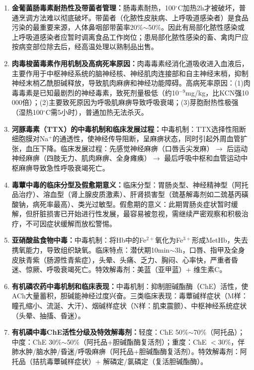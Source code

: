 {\begin{enumerate}[leftmargin=*, itemsep=4pt]
    \item \textbf{金葡菌肠毒素耐热性及带菌者管理：}肠毒素耐热，100$^\circ$C加热2h才被破坏，普通烹调方法难以彻底破坏。带菌者（化脓性皮肤病、上呼吸道感染者）是食品污染的最重要来源，人体鼻咽部带菌率20\%$\sim$50\%。因此有局部化脓性感染或上呼吸道感染者应暂时调离食品工作岗位；患局部化脓性感染的畜、禽肉尸应按病变部位除去后，经高温处理以熟制品出售。

    \item \textbf{肉毒梭菌毒素作用机制及高病死率原因：}肉毒毒素经消化道吸收进入血液后，主要作用于中枢神经系统的脑神经核、神经肌肉连接部和自主神经末梢，抑制神经末梢乙酰胆碱释放，导致肌肉麻痹和神经功能障碍。高病死率原因：(1)肉毒毒素是已知最剧烈的神经毒素，致死剂量极低（约10$^{-9}$mg/kg，比KCN强10\,000倍）；(2)主要致死原因为呼吸肌麻痹导致呼吸衰竭；(3)芽胞耐热性极强（湿热100$^\circ$C需5小时），普通加热无法杀灭。

    \item \textbf{河豚毒素（TTX）的中毒机制和临床发展过程：}中毒机制：TTX选择性阻断细胞膜对Na$^+$的通透性，使神经传导阻断，呈麻痹状态，同时引起外周血管扩张，血压下降。临床发展过程：先感觉神经麻痹（口唇舌尖发麻）$\to$ 后运动神经麻痹（四肢无力、肌肉麻痹、全身瘫痪）$\to$ 最后呼吸中枢和血管运动中枢麻痹导致急性呼吸衰竭死亡。

    \item \textbf{毒蕈中毒的临床分型及假愈期意义：}临床分型：胃肠炎型、神经精神型（阿托品治疗）、溶血型（肾上腺皮质激素）、肝肾损害型（巯基解毒剂如二巯基丙磺酸钠，病死率最高）、类光过敏型。假愈期的意义：此期胃肠炎症状暂时缓解，但肝脏损害已开始进行性发展，最容易被忽视，需继续严密观察和积极治疗，不可因症状缓解而放松警惕。

    \item \textbf{亚硝酸盐食物中毒：}中毒机制：将Hb中的Fe$^{2+}$氧化为Fe$^{3+}$形成MetHb，失去携氧能力，导致组织缺氧。临床特点：潜伏期10min$\sim$3h，口唇、指甲及全身皮肤青紫（肠源性青紫症），头晕、头痛、乏力、胸闷、心率快，严重者昏迷、惊厥、呼吸衰竭死亡。特效解毒剂：美蓝（亚甲蓝）+ 维生素C。

    \item \textbf{有机磷农药中毒机制和临床表现：}中毒机制：抑制胆碱酯酶（ChE）活性，使ACh大量蓄积，胆碱能神经过度兴奋。三类临床表现：毒蕈碱样症状（M样：瞳孔缩小、流涎、大汗）、烟碱样症状（N样：肌束震颤）、中枢神经系统症状（头晕、抽搐、昏迷）。

    \item \textbf{有机磷中毒ChE活性分级及特效解毒剂：}轻度：ChE 50\%$\sim$70\%（阿托品）；中度：ChE 30\%$\sim$50\%（阿托品+胆碱酯酶复活剂）；重度：ChE $<$30\%，伴肺水肿/脑水肿/昏迷/呼吸麻痹（阿托品+胆碱酯酶复活剂）。特效解毒剂：阿托品（拮抗毒蕈碱样症状）+ 解磷定/氯磷定（复活胆碱酯酶）。


\end{enumerate}}
